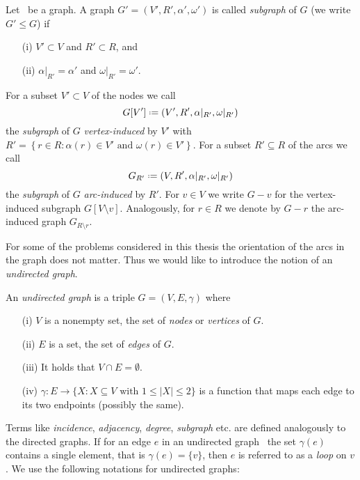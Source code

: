 \begin{definition}
	\label{def:subgraph}
	Let \graph\ be a graph. A graph $G' = (V', R', \alpha', \omega')$ is called \textit{subgraph} of $G$ (we write $G' \leq G$) if
	\begin{itemize}
		\item[(i)] $V' \subset V$ and $R' \subset R$, and
		\item[(ii)] $\alpha|_{R'} = \alpha'$ and $\omega|_{R'} = \omega'$.
	\end{itemize}
	For a subset $V' \subset V$ of the nodes we call
	$$G[V'] \defeq (V', R', \alpha|_{R'}, \omega|_{R'})$$
	the \textit{subgraph} of $G$ \textit{vertex-induced} by $V'$ with $R' = \left \{r \in R \colon \alpha(r) \in V' \text{ and } \omega(r) \in V' \right \}$.
	For a subset $R' \subseteq R$ of the arcs we call
	$$G_{R'} \defeq (V, R', \alpha|_{R'}, \omega|_{R'})$$
	the \textit{subgraph} of $G$ \textit{arc-induced} by $R'$.
	For $v \in V$ we write $G - v$ for the vertex-induced subgraph $G[V \setminus v]$. Analogously, for $r \in R$ we denote by $G - r$ the arc-induced graph $G_{R \setminus {r}}$.
\end{definition}

For some of the problems considered in this thesis the orientation of the arcs in the graph does not matter. Thus we would like to introduce the notion of an \textit{undirected graph}.

\begin{definition}
	\label{def:ugraph}
	An \textit{undirected graph} is a triple $G = (V, E, \gamma)$ where
	\begin{itemize}
		\item[(i)] $V$ is a nonempty set, the set of \textit{nodes} or \textit{vertices} of $G$.
		\item[(ii)] $E$ is a set, the set of \textit{edges} of $G$.
		\item[(iii)] It holds that $V \cap E = \emptyset$.
		\item[(iv)] $\gamma \colon E \to \{ X \colon X \subseteq V \text{ with } 1 \leq |X| \leq 2 \}$ is a function that maps each edge to its two endpoints (possibly the same).
	\end{itemize}
\end{definition}

Terms like \textit{incidence}, \textit{adjacency}, \textit{degree}, \textit{subgraph} etc. are defined analogously to the directed graphs. If for an edge $e$ in an undirected graph \ugraph\ the set $\gamma(e)$ contains a single element, that is $\gamma(e) = \{v\}$, then $e$ is referred to as a \textit{loop} on $v$. We use the following notations for undirected graphs:\medskip

